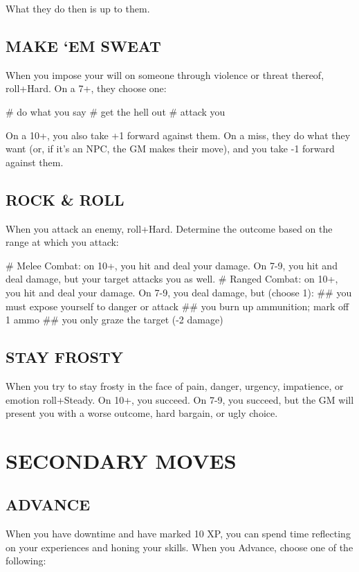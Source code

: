 What they do then is up to them.


\subsection{MAKE ‘EM SWEAT}
When you impose your will on someone through violence or threat thereof, roll+Hard. On a 7+, they choose one:

\begin{easylist}
# do what you say
# get the hell out
# attack you    
\end{easylist}

On a 10+, you also take +1 forward against them. On a miss, they do what they want (or, if it’s an NPC, the GM makes their move), and you take -1 forward against them.


\subsection{ROCK \& ROLL}
When you attack an enemy, roll+Hard. Determine the outcome based on the range at which you attack:

\begin{easylist}
# Melee Combat: on 10+, you hit and deal your damage. On 7-9, you hit and deal damage, but your target attacks you as well.
# Ranged Combat: on 10+, you hit and deal your damage. On 7-9, you deal damage, but (choose 1):
## you must expose yourself to danger or attack
## you burn up ammunition; mark off 1 ammo
## you only graze the target (-2 damage)
\end{easylist}


\subsection{STAY FROSTY}
When you try to stay frosty in the face of pain, danger, urgency, impatience, or emotion roll+Steady. On 10+, you succeed. On 7-9, you succeed, but the GM will present you with a worse outcome, hard bargain, or ugly choice.



\section{SECONDARY MOVES}

\subsection{ADVANCE}
When you have downtime and have marked 10 XP, you can spend time reflecting on your experiences and honing your skills. When you Advance, choose one of the following:

